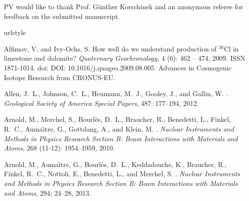 \documentclass[titlepage]{article}
\begin{document}
PV would like to thank Prof. G\"{u}nther Korschinek and an anonymous
referee for feedback on the submitted manuscript.

%
%

\begin{thebibliography}{25}
\providecommand{\natexlab}[1]{#1}
\providecommand{\url}[1]{\texttt{#1}}
\expandafter\ifx\csname urlstyle\endcsname\relax
  \providecommand{\doi}[1]{doi: #1}\else
  \providecommand{\doi}{doi: \begingroup \urlstyle{rm}\Url}\fi

Alfimov, V. and Ivy-Ochs, S.
\newblock How well do we understand production of $^{36}${C}l in limestone and
  dolomite?
\newblock \emph{Quaternary Geochronology}, 4 (6): 462 -- 474,
  2009.
\newblock ISSN 1871-1014.
\newblock \doi{DOI: 10.1016/j.quageo.2009.08.005}.
\newblock Advances in Cosmogenic Isotope Research from CRONUS-EU.

Allen, J.~L., Johnson, C.~L., Heumann, M.~J., Gooley, J., and Gallin, W.
.
\newblock \emph{Geological Society of America Special Papers}, 487:
  177--194, 2012.

Arnold, M., Merchel, S., Bourl{\`e}s, D.~L., Braucher, R., Benedetti, L.,
  Finkel, R.~C., Auma{\^\i}tre, G., Gottdang, A., and Klein, M.
.
\newblock \emph{Nuclear Instruments and Methods in Physics Research Section B:
  Beam Interactions with Materials and Atoms}, 268 (11-12):
  1954--1959, 2010.

Arnold, M., Auma{\^\i}tre, G., Bourl{\`e}s, D.~L., Keddadouche, K., Braucher,
  R., Finkel, R.~C., Nottoli, E., Benedetti, L., and Merchel, S.
.
\newblock \emph{Nuclear Instruments and Methods in Physics Research Section B:
  Beam Interactions with Materials and Atoms}, 294: 24--28, 2013.


\end{thebibliography}
\end{document}
